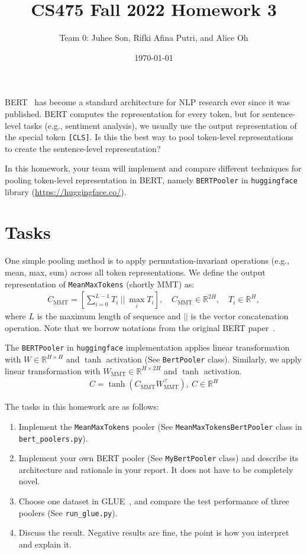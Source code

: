\documentclass[UTF8]{article}
\title{CS475 Fall 2022 Homework 3}
\author{
  Team 0:  %
  Juhee Son, Rifki Afina Putri, and Alice Oh  %
}
\date{\today}
\begin{document}
\maketitle

BERT~\cite{devlin-etal-2019-bert} has become a standard architecture for NLP research ever since it was published. BERT computes the representation for every token, but for sentence-level tasks (e.g., sentiment analysis), we usually use the output representation of the special token \texttt{[CLS]}. Is this the best way to pool token-level representations to create the sentence-level representation?

In this homework, your team will implement and compare different techniques for pooling token-level representation in BERT, namely \texttt{BERTPooler} in \texttt{huggingface} library (\url{https://huggingface.co/}).

\section{Tasks}

One simple pooling method is to apply permutation-invariant operations (e.g., mean, max, sum) across all token representations. We define the output representation of \texttt{MeanMaxTokens} (shortly MMT) as:
\begin{align}
  C_{\text{MMT}} = \left[
    \textstyle \sum_{i=0}^{L - 1} T_{i}\ ||\ \max_i T_{i}
  \right],\quad
   C_{\text{MMT}} \in \mathbb{R}^{2H},\quad
   T_i \in \mathbb{R}^{H},
\end{align}
where $L$ is the maximum length of sequence and $||$ is the vector concatenation operation. Note that we borrow notations from the original BERT paper~\cite{devlin-etal-2019-bert}. 

The \texttt{BERTPooler} in \texttt{huggingface} implementation applies linear transformation with $W \in \mathbb{R}^{H \times H}$ and $\tanh$ activation (See \texttt{BertPooler} class). Similarly, we apply linear transformation with $W_{\text{MMT}} \in \mathbb{R}^{H \times 2H}$ and $\tanh$ activation.
\begin{align}
  C = \tanh(C_{\text{MMT}}W_{\text{MMT}}^\top),\ C \in \mathbb{R}^{H}
\end{align}

The tasks in this homework are as follows:
\begin{enumerate}
  \item Implement the \texttt{MeanMaxTokens} pooler (See \texttt{MeanMaxTokensBertPooler} class in \texttt{bert\_poolers.py}).
  \item Implement your own BERT pooler (See \texttt{MyBertPooler} class) and describe its architecture and rationale in your report. It does not have to be completely novel.
  \item Choose one dataset in GLUE~\cite{wang2018glue}, and compare the test performance of three poolers (See \texttt{run\_glue.py}).
  \item Discuss the result. Negative results are fine, the point is how you interpret and explain it.
\end{enumerate}
\end{document}
